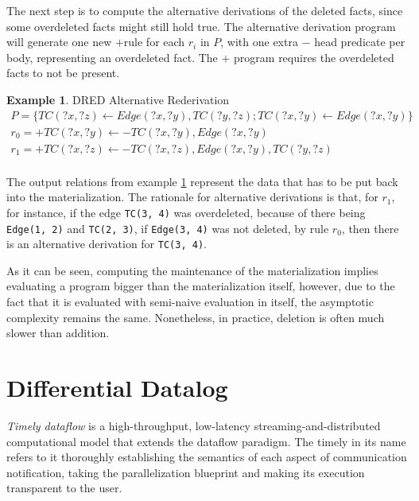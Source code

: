 \documentclass[sigconf,screen,review,natbib]{acmart}
\theoremstyle{definition}
\newtheorem{exmp}{Example}[section]
\begin{document}
The next step is to compute the alternative derivations of the deleted facts, since some overdeleted facts might still hold true. The alternative derivation program will generate one new $+$rule for each $r_i$ in $P$, with one extra $-$ head predicate per body, representing an overdeleted fact. The $+$ program requires the overdeleted facts to not be present.

\begin{exmp}{DRED Alternative Rederivation}
	\tiny
	\begin{align}
		P = \{ TC(?x, ?z) \leftarrow Edge(?x, ?y), TC(?y, ?z); TC(?x, ?y) \leftarrow Edge(?x, ?y) \} \nonumber                                                           \\
		r_0 = +TC(?x, ?y) \leftarrow -TC(?x, ?y), Edge(?x, ?y)                                                                                                           \\
		r_1 = +TC(?x, ?z) \leftarrow -TC(?x, ?z), Edge(?x, ?y), TC(?y, ?z)                                                                                     \nonumber \\
	\end{align}
	\label{ex7}
\end{exmp}

The output relations from example \ref{ex7} represent the data that has to be put back into the materialization. The rationale for alternative derivations is that, for $r_1$, for instance, if the edge \verb|TC(3, 4)| was overdeleted, because of there being \verb|Edge(1, 2)| and \verb|TC(2, 3)|, if \verb|Edge(3, 4)| was not deleted, by rule $r_0$, then there is an alternative derivation for \verb|TC(3, 4)|.

As it can be seen, computing the maintenance of the materialization implies evaluating a program bigger than the materialization itself, however, due to the fact that it is evaluated with semi-naive evaluation in itself, the asymptotic complexity remains the same\cite{complexity_of_dred}. Nonetheless, in practice, deletion is often much slower than addition.

\section{Differential Datalog}

\emph{Timely dataflow} is a high-throughput, low-latency
streaming-and-distributed computational model that extends the dataflow paradigm. The timely
in its name refers to it thoroughly establishing the semantics of each aspect of communication
notification, taking the parallelization blueprint and making its execution transparent to the user.
\end{document}
